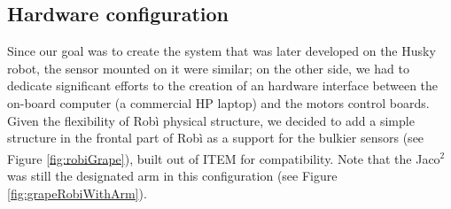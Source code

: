 \subsection{Hardware configuration}
Since our goal was to create the system that was later developed on the Husky robot, the sensor mounted on it were similar; on the other side, we had to dedicate significant efforts to the creation of an hardware interface between the on-board computer (a commercial HP laptop) and the motors control boards. Given the flexibility of Robì physical structure, we decided to add a simple structure in the frontal part of Robì as a support for the bulkier sensors (see Figure \ref{fig:robiGrape}), built out of ITEM\textsuperscript{\textregistered} for compatibility. Note that the Jaco$^2$ was still the designated arm in this configuration (see Figure \ref{fig:grapeRobiWithArm}).
